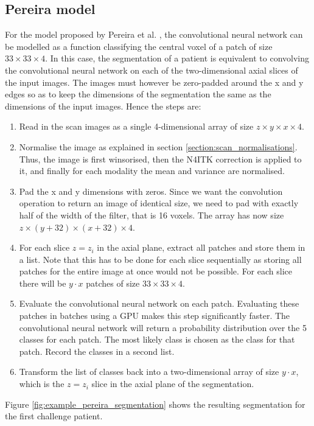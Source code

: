 \documentclass[12pt,a4paper,twoside,openright]{report}
\begin{document}
\subsection{Pereira model}
For the model proposed by Pereira et al. \cite{pereira}, the convolutional neural network can be modelled as a function classifying the central voxel of a patch of size $33 \times 33 \times 4$. In this case, the segmentation of a patient is equivalent to convolving the convolutional neural network on each of the two-dimensional axial slices of the input images. The images must however be zero-padded around the x and y edges so as to keep the dimensions of the segmentation the same as the dimensions of the input images. Hence the steps are:
\begin{enumerate}
	\item Read in the scan images as a single 4-dimensional array of size $z \times y \times x \times 4$.
	\item Normalise the image as explained in section \ref{section:scan_normalisations}. Thus, the image is first winsorised, then the N4ITK correction is applied to it, and finally for each modality the mean and variance are normalised.
	\item Pad the x and y dimensions with zeros. Since we want the convolution operation to return an image of identical size, we need to pad with exactly half of the width of the filter, that is 16 voxels. The array has now size $z \times (y + 32) \times (x + 32) \times 4$.
	\item For each slice $z = z_i$ in the axial plane, extract all patches and store them in a list. Note that this has to be done for each slice sequentially as storing all patches for the entire image at once would not be possible. For each slice there will be $y \cdot x$ patches of size $33 \times 33 \times 4$.
	\item Evaluate the convolutional neural network on each patch. Evaluating these patches in batches using a GPU makes this step significantly faster. The convolutional neural network will return a probability distribution over the 5 classes for each patch. The most likely class is chosen as the class for that patch. Record the classes in a second list.
	\item Transform the list of classes back into a two-dimensional array of size $y \cdot x$, which is the $z = z_i$ slice in the axial plane of the segmentation.
\end{enumerate}

Figure \ref{fig:example_pereira_segmentation} shows the resulting segmentation for the first challenge patient.
\end{document}
